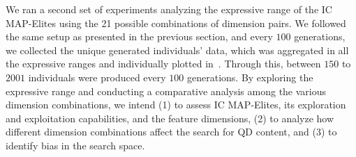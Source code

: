 



We ran a second set of experiments analyzing the expressive range \cite{p6Smith:2010:Expressive-range} of the IC MAP-Elites using the 21 possible combinations of dimension pairs. We followed the same setup as presented in the previous section, and every $100$ generations, we collected the unique generated individuals' data, which was aggregated in all the expressive ranges and individually plotted in~. Through this, between $150$ to $2001$ individuals were produced every $100$ generations. By exploring the expressive range and conducting a comparative analysis among the various dimension combinations, we intend (1) to assess IC MAP-Elites, its exploration and exploitation capabilities, and the feature dimensions, (2) to analyze how different dimension combinations affect the search for QD content, and (3) to identify bias in the search space.

